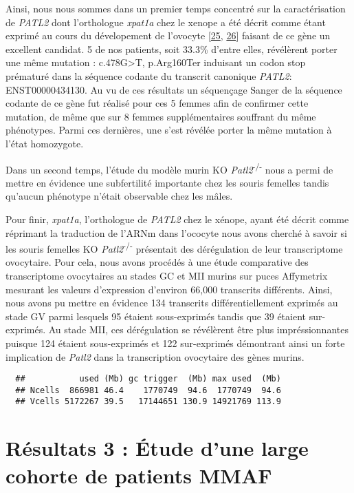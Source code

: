 \documentclass[12pt,twoside]{reedthesis}
\theoremstyle{definition}
\theoremstyle{definition}
\theoremstyle{remark}
\begin{document}
  Ainsi, nous nous sommes dans un premier temps concentré sur la
  caractérisation de \emph{PATL2} dont l'orthologue \emph{xpat1a} chez le
  xenope a été décrit comme étant exprimé au cours du dévelopement de
  l'ovocyte {[}\protect\hyperlink{ref-Marnef2010}{25},
  \protect\hyperlink{ref-Nakamura2010}{26}{]} faisant de ce gène un
  excellent candidat. 5 de nos patients, soit 33.3\% d'entre elles,
  révélèrent porter une même mutation : c.478G\textgreater{}T, p.Arg160Ter
  induisant un codon stop prématuré dans la séquence codante du transcrit
  canonique \emph{PATL2}: ENST00000434130. Au vu de ces résultats un
  séquençage Sanger de la séquence codante de ce gène fut réalisé pour ces
  5 femmes afin de confirmer cette mutation, de même que sur 8 femmes
  supplémentaires souffrant du même phénotypes. Parmi ces dernières, une
  s'est révélée porter la même mutation à l'état homozygote.
  
  Dans un second temps, l'étude du modèle murin KO
  \emph{Patl2}\textsuperscript{-/-} nous a permi de mettre en évidence une
  subfertilité importante chez les souris femelles tandis qu'aucun
  phénotype n'était observable chez les mâles.
  
  Pour finir, \emph{xpat1a}, l'orthologue de \emph{PATL2} chez le xénope,
  ayant été décrit comme réprimant la traduction de l'ARNm dans l'ococyte
  nous avons cherché à savoir si les souris femelles KO
  \emph{Patl2}\textsuperscript{-/-} présentait des dérégulation de leur
  transcriptome ovocytaire. Pour cela, nous avons procédés à une étude
  comparative des transcriptome ovocytaires au stades GC et MII murins sur
  puces Affymetrix mesurant les valeurs d'expression d'environ 66,000
  transcrits différents. Ainsi, nous avons pu mettre en évidence 134
  transcrits différentiellement exprimés au stade GV parmi lesquels 95
  étaient sous-exprimés tandis que 39 étaient sur-exprimés. Au stade MII,
  ces dérégulation se révélèrent être plus impréssionnantes puisque 124
  étaient sous-exprimés et 122 sur-exprimés démontrant ainsi un forte
  implication de \emph{Patl2} dans la transcription ovocytaire des gènes
  murins.
  
  \begin{verbatim}
  ##           used (Mb) gc trigger  (Mb) max used  (Mb)
  ## Ncells  866981 46.4    1770749  94.6  1770749  94.6
  ## Vcells 5172267 39.5   17144651 130.9 14921769 113.9
  \end{verbatim}
  
  \newpage  
  
  \section{Résultats 3 : Étude d'une large cohorte de patients
  MMAF}\label{resultats-3-etude-dune-large-cohorte-de-patients-mmaf}
  
\end{document}
